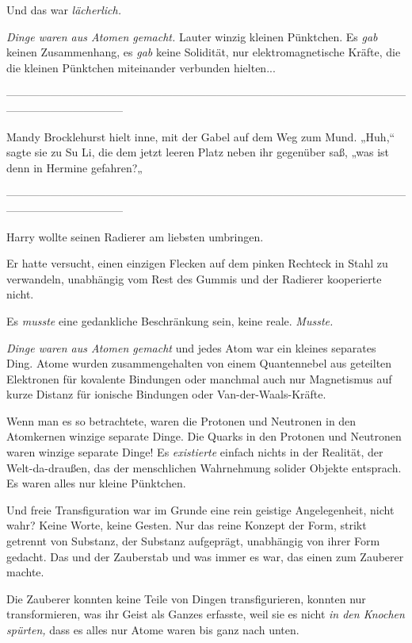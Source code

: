 {Und das war \emph{lächerlich.}

\emph{Dinge waren aus Atomen gemacht.} Lauter winzig kleinen Pünktchen. Es \emph{gab} keinen Zusammenhang, es \emph{gab} keine Solidität, nur elektromagnetische Kräfte, die die kleinen Pünktchen miteinander verbunden hielten...

--------------------------------------------------------------------------------------------------------------------------------------------

\hfill\break Mandy Brocklehurst hielt inne, mit der Gabel auf dem Weg zum Mund. „Huh,“ sagte sie zu Su Li, die dem jetzt leeren Platz neben ihr gegenüber saß, „was ist denn in Hermine gefahren?„

--------------------------------------------------------------------------------------------------------------------------------------------

\hfill\break Harry wollte seinen Radierer am liebsten umbringen.

Er hatte versucht, einen einzigen Flecken auf dem pinken Rechteck in Stahl zu verwandeln, unabhängig vom Rest des Gummis und der Radierer kooperierte nicht.

Es \emph{musste} eine gedankliche Beschränkung sein, keine reale. \emph{Musste.}

\emph{Dinge waren aus Atomen gemacht} und jedes Atom war ein kleines separates Ding. Atome wurden zusammengehalten von einem Quantennebel aus geteilten Elektronen für kovalente Bindungen oder manchmal auch nur Magnetismus auf kurze Distanz für ionische Bindungen oder Van-der-Waals-Kräfte.

Wenn man es so betrachtete, waren die Protonen und Neutronen in den Atomkernen winzige separate Dinge. Die Quarks in den Protonen und Neutronen waren winzige separate Dinge! Es \emph{existierte} einfach nichts in der Realität, der Welt-da-draußen, das der menschlichen Wahrnehmung solider Objekte entsprach. Es waren alles nur kleine Pünktchen.

Und freie Transfiguration war im Grunde eine rein geistige Angelegenheit, nicht wahr? Keine Worte, keine Gesten. Nur das reine Konzept der Form, strikt getrennt von Substanz, der Substanz aufgeprägt, unabhängig von ihrer Form gedacht. Das und der Zauberstab und was immer es war, das einen zum Zauberer machte.

Die Zauberer konnten keine Teile von Dingen transfigurieren, konnten nur transformieren, was ihr Geist als Ganzes erfasste, weil sie es nicht \emph{in den Knochen spürten,} dass es alles nur Atome waren bis ganz nach unten.

}

